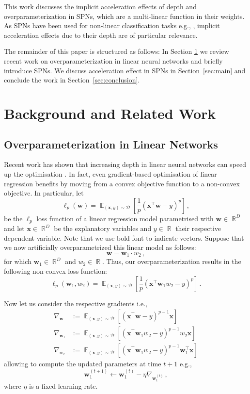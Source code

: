 \documentclass{article}
\DeclareMathOperator*{\E}{\mathbb{E}}
\DeclareMathOperator*{\R}{\mathbb{R}}
\begin{document}
This work discusses the implicit acceleration effects of depth and overparameterization in SPNs, which are a multi-linear function in their weights. As SPNs have been used for non-linear classification tasks e.g., \cite{Gens2012,Trapp2017,Peharz2018}, implicit acceleration effects due to their depth are of particular relevance.

The remainder of this paper is structured as follows:
In Section \ref{sec:background} we review recent work on overparameterization in linear neural networks and briefly introduce SPNs.
We discuss acceleration effect in SPNs in Section~\ref{sec:main} and conclude the work in Section~\ref{sec:conclusion}.

\section{Background and Related Work} \label{sec:background}
\subsection{Overparameterization in Linear Networks}
Recent work has shown that increasing depth in linear neural networks can speed up the optimisation \cite{Arora2018}. 
In fact, even gradient-based optimisation of linear regression benefits by moving from a convex objective function to a non-convex objective.
In particular, let
\[
\ell_p(\bm w) = \E_{(\bm{x},y) \sim \mathcal{D}} \left[ \frac{1}{p} (\bm x^{\top} \bm w - y)^p \right] \, ,
\]
be the $\ell_p$ loss function of a linear regression model parametrised with $\bm w \in \R^D$ and let $\bm{x} \in \R^D$ be the explanatory variables and $y \in \R$ their respective dependent variable.
Note that we use bold font to indicate vectors.
Suppose that we now artificially overparametrized this linear model as follows:
\[
\bm w = \bm w_1 \cdot w_2 \, ,
\]
for which $\bm w_1 \in \R^D$ and $w_2 \in \R$.
Thus, our overparameterization results in the following non-convex loss function:
\[
\ell_p(\bm w_1, w_2) = \E_{(\bm{x},y) \sim \mathcal{D}} \left[ \frac{1}{p} (\bm x^{\top} \bm w_1 w_2 - y)^p \right] \, .
\]

Now let us consider the respective gradients i.e., 
\begin{align*}
  \nabla_{\bm w} &:= \E_{(\bm{x},y) \sim \mathcal{D}} \left[ (\bm x^{\top} \bm w - y)^{p-1} \bm x \right] \\
  \nabla_{\bm w_1} &:= \E_{(\bm{x},y) \sim \mathcal{D}} \left[ (\bm x^{\top} \bm w_1 w_2 - y)^{p-1} w_2 \bm x \right] \\
  \nabla_{w_2} &:= \E_{(\bm{x},y) \sim \mathcal{D}} \left[ (\bm x^{\top} \bm w_1 w_2 - y)^{p-1} \bm w_1^{\top} \bm x \right]
\end{align*}
allowing to compute the updated parameters at time $t+1$ e.g.,
\[
\bm w^{(t+1)}_1 \leftarrow \bm w^{(t)}_1 - \eta \nabla_{\bm w^{(t)}_1} \, ,
\]
where $\eta$ is a fixed learning rate.
\end{document}
